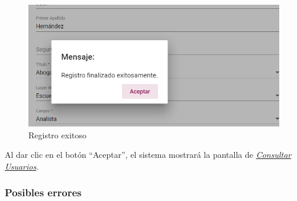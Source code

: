 
             \begin{figure}[H]
            	\centering
            \includegraphics[width=0.4\linewidth]{images/SP5/MSG5}
            	\caption{Registro exitoso}
            	\label{mensaje5}

            \end{figure}

            Al dar clic en el botón “Aceptar”, el sistema mostrará la pantalla de  \hyperlink{consultarUs}{\textit{Consultar Usuarios}}.

            \subsubsection{Posibles errores}

